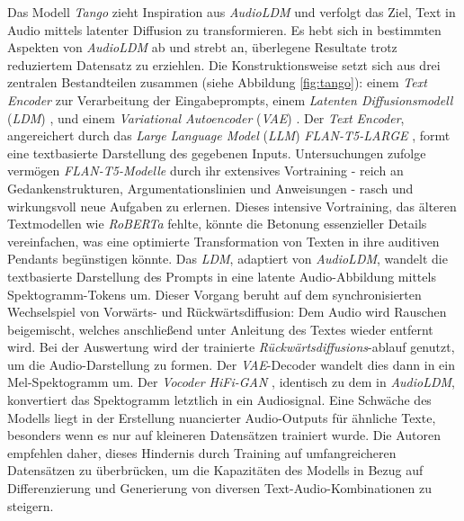 \documentclass[
  a4paper,  %
  twoside,  %
  bibliography=totoc,
  headsepline,
  cleardoublepage=empty,
  parskip=half,
  draft=false
]{scrbook}
\begin{document}
Das Modell \emph{Tango} \cite{ghosal_text--audio_2023} zieht Inspiration aus \emph{AudioLDM} und verfolgt das Ziel, Text in Audio mittels latenter Diffusion zu transformieren. Es hebt sich in bestimmten Aspekten von \emph{AudioLDM} ab und strebt an, überlegene Resultate trotz reduziertem Datensatz zu erziehlen. Die Konstruktionsweise setzt sich aus drei zentralen Bestandteilen zusammen (siehe Abbildung \ref{fig:tango}): einem \emph{Text Encoder} zur Verarbeitung der Eingabeprompts, einem \emph{Latenten Diffusionsmodell} (\emph{LDM}) \cite{rombach_high-resolution_2022}, und einem \emph{Variational Autoencoder} (\emph{VAE}) \cite{kingma_auto-encoding_2022}. Der \emph{Text Encoder}, angereichert durch das \emph{Large Language Model} (\emph{LLM}) \emph{FLAN-T5-LARGE} \cite{chung_scaling_2022}, formt eine textbasierte Darstellung des gegebenen Inputs. Untersuchungen \cite{dai_why_2023} zufolge vermögen \emph{FLAN-T5-Modelle} durch ihr extensives Vortraining - reich an Gedankenstrukturen, Argumentationslinien und Anweisungen - rasch und wirkungsvoll neue Aufgaben zu erlernen. Dieses intensive Vortraining, das älteren Textmodellen wie \emph{RoBERTa} \cite{liu_roberta_2019} fehlte, könnte die Betonung essenzieller Details vereinfachen, was eine optimierte Transformation von Texten in ihre auditiven Pendants begünstigen könnte. Das \emph{LDM}, adaptiert von \emph{AudioLDM}, wandelt die textbasierte Darstellung des Prompts in eine latente Audio-Abbildung mittels Spektogramm-Tokens um. Dieser Vorgang beruht auf dem synchronisierten Wechselspiel von Vorwärts- und Rückwärtsdiffusion: Dem Audio wird Rauschen beigemischt, welches anschließend unter Anleitung des Textes wieder entfernt wird. Bei der Auswertung wird der trainierte \emph{Rückwärtsdiffusions}-ablauf genutzt, um die Audio-Darstellung zu formen. Der \emph{VAE}-Decoder wandelt dies dann in ein Mel-Spektogramm um. Der \emph{Vocoder HiFi-GAN} \cite{kong_hifi-gan_2020}, identisch zu dem in \emph{AudioLDM}, konvertiert das Spektogramm letztlich in ein Audiosignal. Eine Schwäche des Modells liegt in der Erstellung nuancierter Audio-Outputs für ähnliche Texte, besonders wenn es nur auf kleineren Datensätzen trainiert wurde. Die Autoren empfehlen daher, dieses Hindernis durch Training auf umfangreicheren Datensätzen zu überbrücken, um die Kapazitäten des Modells in Bezug auf Differenzierung und Generierung von diversen Text-Audio-Kombinationen zu steigern. \cite{ghosal_text--audio_2023}
\end{document}
